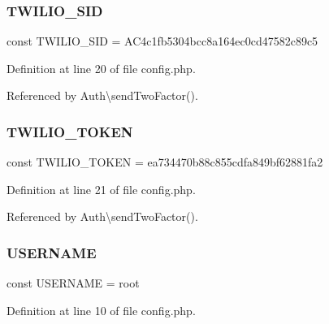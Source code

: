\hypertarget{config_8php_a9b6aafbdebd605cd4fb6f5749b53e59f}{}\label{config_8php_a9b6aafbdebd605cd4fb6f5749b53e59f} 
\subsubsection{\texorpdfstring{T\+W\+I\+L\+I\+O\+\_\+\+S\+ID}{TWILIO\_SID}}
{\footnotesize\ttfamily const T\+W\+I\+L\+I\+O\+\_\+\+S\+ID = \textquotesingle{}A\+C4c1fb5304bcc8a164ec0cd47582c89c5\textquotesingle{}}



Definition at line 20 of file config.\+php.



Referenced by Auth\textbackslash{}send\+Two\+Factor().

\hypertarget{config_8php_a0477d5c66524299f08cae7376eb7884c}{}\label{config_8php_a0477d5c66524299f08cae7376eb7884c} 
\subsubsection{\texorpdfstring{T\+W\+I\+L\+I\+O\+\_\+\+T\+O\+K\+EN}{TWILIO\_TOKEN}}
{\footnotesize\ttfamily const T\+W\+I\+L\+I\+O\+\_\+\+T\+O\+K\+EN = \textquotesingle{}ea734470b88c855cdfa849bf62881fa2\textquotesingle{}}



Definition at line 21 of file config.\+php.



Referenced by Auth\textbackslash{}send\+Two\+Factor().

\hypertarget{config_8php_a74aeb024c560ee70f79b2c2b039bc113}{}\label{config_8php_a74aeb024c560ee70f79b2c2b039bc113} 
\subsubsection{\texorpdfstring{U\+S\+E\+R\+N\+A\+ME}{USERNAME}}
{\footnotesize\ttfamily const U\+S\+E\+R\+N\+A\+ME = \textquotesingle{}root\textquotesingle{}}



Definition at line 10 of file config.\+php.

